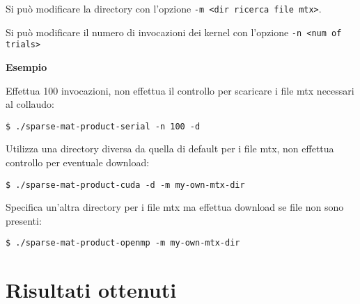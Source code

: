 \documentclass[a4paper,9pt]{extarticle}
\begin{document}
Si può modificare la directory con l'opzione \texttt{-m <dir ricerca file mtx>}.

Si può modificare il numero di invocazioni dei kernel con l'opzione \texttt{-n <num of trials>}

\textbf{Esempio}

Effettua 100 invocazioni, non effettua il controllo per scaricare i file mtx necessari al collaudo:
\begin{lstlisting}
$ ./sparse-mat-product-serial -n 100 -d
\end{lstlisting}

Utilizza una directory diversa da quella di default per i file mtx, non effettua controllo per eventuale download:
\begin{lstlisting}
$ ./sparse-mat-product-cuda -d -m my-own-mtx-dir
\end{lstlisting}

Specifica un'altra directory per i file mtx ma effettua download se file non sono presenti:
\begin{lstlisting}
$ ./sparse-mat-product-openmp -m my-own-mtx-dir
\end{lstlisting}

\pagebreak
	
\section{Risultati ottenuti}
\end{document}
